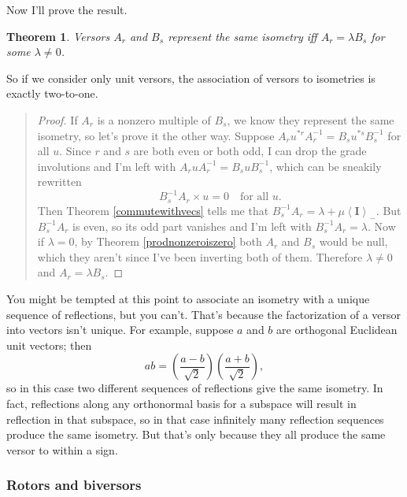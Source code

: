 \documentclass{utarticle}
\newcommand{\bl}[1]{\ensuremath{\bm{#1}}}
\newcommand{\I}{\bl{I}}
\newcommand{\grinv}[2][]{\ensuremath{#2^{*#1}}}
\newcommand{\commute}[2]{\ensuremath{#1 \times #2}}
\newcommand{\grade}[2][]{\ensuremath{\left\langle #2 \right\rangle_{#1}}}
\newtheorem{thm}{Theorem}
\newcommand{\bp}{\begin{quotation} \begin{proof}}
\newcommand{\ep}{\end{proof} \end{quotation}}
\begin{document}
Now I'll prove the result.
\begin{thm}
Versors $A_r$ and $B_s$ represent the same isometry iff $A_r = \lambda B_s$ for some $\lambda \neq 0$.
\end{thm}
So if we consider only unit versors, the association of versors to isometries is exactly two-to-one.
\bp
If $A_r$ is a nonzero multiple of $B_s$, we know they represent the same isometry, so let's prove it the other way.
Suppose $A_r \grinv[r]{u} A_r^{-1}  = B_s \grinv[s]{u} B_s^{-1}$ for all $u$.  Since $r$ and $s$ are 
both even or both odd, I can drop the grade involutions and I'm left with $A_r u A_r^{-1}  = 
B_s u B_s^{-1}$, which can be sneakily rewritten
\begin{equation} \commute{B_s^{-1}A_r}{u} = 0 \quad \text{for all $u$.} \end{equation}
Then Theorem \ref{commutewithvecs} tells me that $B_s^{-1}A_r = \lambda + \mu \grade[-]{\I}$.  
But $B_s^{-1}A_r$ is even, so its odd part vanishes and I'm left with $B_s^{-1}A_r = \lambda$.
Now if $\lambda= 0$, by Theorem \ref{prodnonzeroiszero} both $A_r$ and $B_s$ would be null, 
which they aren't since I've been inverting both of them.  Therefore $\lambda \neq 0$ and 
$A_r = \lambda B_s$.
\ep
You might be tempted at this point to associate an isometry with a unique sequence of reflections,
but you can't.  That's because the factorization of a versor into vectors isn't unique.  For example, 
suppose $a$ and $b$ are orthogonal Euclidean unit vectors; then
\begin{equation} ab = \left(\frac{a-b}{\sqrt{2}}\right) \left(\frac{a+b}{\sqrt{2}}\right), \end{equation}
so in this case two different sequences of reflections give the same isometry.  In fact, reflections along
any orthonormal basis for a subspace will result in reflection in that subspace, so in that case infinitely 
many reflection sequences produce the same isometry.  But that's only because they all produce the 
same versor to within a sign.

\subsubsection{Rotors and biversors}
\label{rotors}
\end{document}
